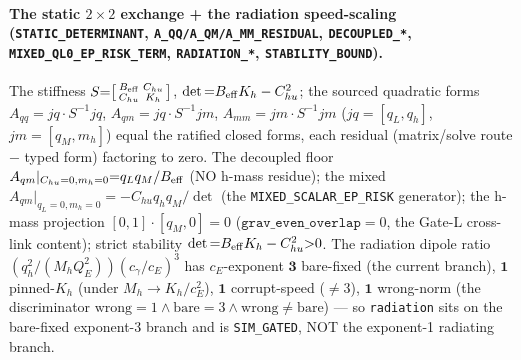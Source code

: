 \paragraph{The static \(2\times2\) exchange + the radiation speed-scaling (\texttt{STATIC\_DETERMINANT}, \texttt{A\_QQ/A\_QM/A\_MM\_RESIDUAL}, \texttt{DECOUPLED\_*}, \texttt{MIXED\_QL0\_EP\_RISK\_TERM}, \texttt{RADIATION\_*}, \texttt{STABILITY\_BOUND}).}
The stiffness
\(S{=}\bigl[\begin{smallmatrix}B_{\rm eff}&C_{hu}\\C_{hu}&K_h\end{smallmatrix}\bigr]\),
\(\det{=}B_{\rm eff}K_h-C_{hu}^2\); the sourced quadratic forms \(A_{qq}{=}jq\cdot
S^{-1}jq\), \(A_{qm}{=}jq\cdot S^{-1}jm\), \(A_{mm}{=}jm\cdot S^{-1}jm\)
(\(jq{=}[q_L,q_h]\), \(jm{=}[q_M,m_h]\)) equal the ratified closed forms, each
residual (matrix/solve route \(-\) typed form) factoring to zero. The decoupled
floor \(A_{qm}|_{C_{hu}{=}0,m_h{=}0}{=}q_Lq_M/B_{\rm eff}\) (NO h-mass residue);
the mixed \(A_{qm}|_{q_L{=}0,m_h{=}0}{=}-C_{hu}q_hq_M/\det\) (the
\texttt{MIXED\_SCALAR\_EP\_RISK} generator); the h-mass projection
\([0,1]\cdot[q_M,0]{=}0\) (\(\texttt{grav\_even\_overlap}{=}0\), the Gate-L
cross-link content); strict stability \(\det{=}B_{\rm eff}K_h-C_{hu}^2{>}0\). The
radiation dipole ratio \((q_h^2/(M_hQ_E^2))(c_\gamma/c_E)^3\) has \(c_E\)-exponent
\(\mathbf{3}\) bare-fixed (the current branch), \(\mathbf{1}\) pinned-\(K_h\)
(under \(M_h{\to}K_h/c_E^2\)), \(\mathbf{1}\) corrupt-speed (\(\neq3\)),
\(\mathbf{1}\) wrong-norm (the discriminator \(\text{wrong}{=}1\wedge\text{bare}{=}3
\wedge\text{wrong}{\neq}\text{bare}\)) --- so \texttt{radiation} sits on the
bare-fixed exponent-3 branch and is \texttt{SIM\_GATED}, NOT the exponent-1
radiating branch.

